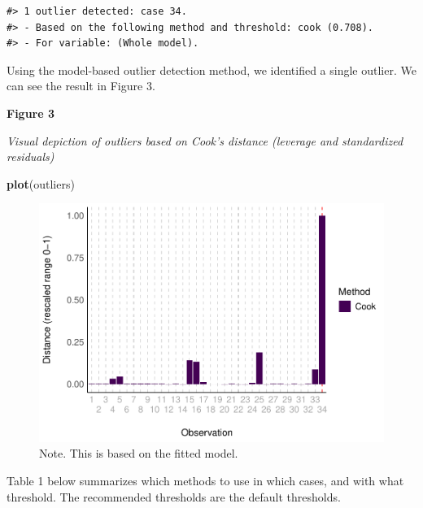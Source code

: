 \documentclass[sn-basic, lineno,pdflatex]{sn-jnl}
\newenvironment{Shaded}{\begin{snugshade}}{\end{snugshade}}
\newcommand{\FunctionTok}[1]{\textcolor[rgb]{0.13,0.29,0.53}{\textbf{#1}}}
\newcommand{\NormalTok}[1]{#1}
\begin{document}
\begin{verbatim}
#> 1 outlier detected: case 34.
#> - Based on the following method and threshold: cook (0.708).
#> - For variable: (Whole model).
\end{verbatim}

Using the model-based outlier detection method, we identified a single
outlier. We can see the result in Figure 3.

\textbf{Figure 3}

\emph{Visual depiction of outliers based on Cook's distance (leverage
and standardized residuals)}

\begin{Shaded}
\begin{Highlighting}[]
\FunctionTok{plot}\NormalTok{(outliers)}
\end{Highlighting}
\end{Shaded}

\begin{figure}
\includegraphics[width=1\linewidth]{paper_files/figure-latex/model_fig-1} \caption{Note. This is based on the fitted model.}\label{fig:model_fig}
\end{figure}

Table 1 below summarizes which methods to use in which cases, and with
what threshold. The recommended thresholds are the default thresholds.
\end{document}
